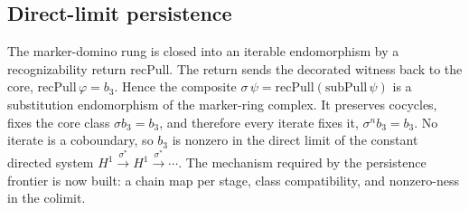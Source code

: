\subsection{Direct-limit persistence}

\begin{theorem}\label{thm:jeandel-rao-substitution-tower}\leanok{}
The marker-domino rung is closed into an iterable endomorphism by a
recognizability return $\mathrm{recPull}$. The return sends the decorated
witness back to the core, $\mathrm{recPull}\,\varphi=b_3$. Hence the composite
$\sigma\,\psi=\mathrm{recPull}(\mathrm{subPull}\,\psi)$ is a substitution
endomorphism of the marker-ring complex. It preserves cocycles, fixes the core
class $\sigma b_3=b_3$, and therefore every iterate fixes it,
$\sigma^n b_3=b_3$. No iterate is a coboundary, so $b_3$ is nonzero in the
direct limit of the constant directed system
$H^1 \xrightarrow{\sigma^\ast} H^1 \xrightarrow{\sigma^\ast}\cdots$. The
mechanism required by the persistence frontier is now built: a chain map per
stage, class compatibility, and nonzero-ness in the colimit.
\end{theorem}

